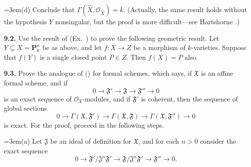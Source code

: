 {\noindent\hangindent=3em\hspace*{1.7em}(d) Conclude that $\Gamma(\widehat X,\mathcal O_{\widehat X})=k$. (Actually, the same result holds without the hypothesis $Y$ nonsingular, but the proof is more difficult---see Hartshorne .)

\smallskip
\noindent\hypertarget{ex-II-9.2}{}\textbf{9.2.} Use the result of (Ex.~) to prove the following geometric result. Let $Y\subseteq X=\mathbf P_k^n$ be as above, and let $f\colon X\to Z$ be a morphism of $k$-varieties. Suppose that $f(Y)$ is a single closed point $P\in Z$. Then $f(X)=P$ also.

\smallskip
\noindent\hypertarget{ex-II-9.3}{}\textbf{9.3.} Prove the analogue of () for formal schemes, which says, if $\mathfrak X$ is an affine formal scheme, and if
\[
0\longrightarrow\mathfrak F'\longrightarrow\mathfrak F\longrightarrow\mathfrak F''\longrightarrow0
\]
is an exact sequence of $\mathcal O_{\mathfrak X}$-modules, and if $\mathfrak F'$ is coherent, then the sequence of global sections
\[
0\longrightarrow\Gamma(\mathfrak X,\mathfrak F')\longrightarrow\Gamma(\mathfrak X,\mathfrak F)\longrightarrow\Gamma(\mathfrak X,\mathfrak F'')\longrightarrow0
\]
is exact. For the proof, proceed in the following steps.

\noindent\hangindent=3em\hspace*{1.7em}(a) Let $\mathfrak J$ be an ideal of definition for $\mathfrak X$, and for each $n>0$ consider the exact sequence
\[
0\longrightarrow\mathfrak F'/\mathfrak J^n\mathfrak F'\longrightarrow\mathfrak F/\mathfrak J^n\mathfrak F'\longrightarrow\mathfrak F''\longrightarrow0.
\]}
